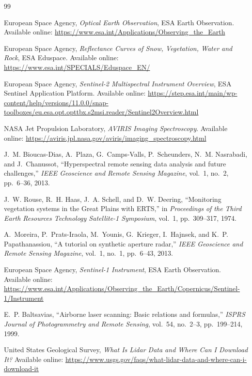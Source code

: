 \documentclass[11pt,a4paper]{article}
\begin{document}
\begin{thebibliography}{99}

European Space Agency,
\textit{Optical Earth Observation},
ESA Earth Observation.
Available online:
\url{https://www.esa.int/Applications/Observing_the_Earth}

European Space Agency,
\textit{Reflectance Curves of Snow, Vegetation, Water and Rock},
ESA Eduspace.
Available online:
\url{https://www.esa.int/SPECIALS/Eduspace_EN/}

European Space Agency,
\textit{Sentinel-2 Multispectral Instrument Overview},
ESA Sentinel Application Platform.
Available online:
\url{https://step.esa.int/main/wp-content/help/versions/11.0.0/snap-toolboxes/eu.esa.opt.opttbx.s2msi.reader/Sentinel2Overview.html}

NASA Jet Propulsion Laboratory,
\textit{AVIRIS Imaging Spectroscopy}.
Available online:
\url{https://aviris.jpl.nasa.gov/aviris/imaging_spectroscopy.html}

J.~M. Bioucas-Dias, A.~Plaza, G.~Camps-Valls, P.~Scheunders,
N.~M. Nasrabadi, and J.~Chanussot,
``Hyperspectral remote sensing data analysis and future challenges,''
\textit{IEEE Geoscience and Remote Sensing Magazine},
vol.~1, no.~2, pp.~6--36, 2013.

J.~W. Rouse, R.~H. Haas, J.~A. Schell, and D.~W. Deering,
``Monitoring vegetation systems in the Great Plains with ERTS,''
in \textit{Proceedings of the Third Earth Resources Technology
Satellite-1 Symposium},
vol.~1, pp.~309--317, 1974.

A.~Moreira, P.~Prats-Iraola, M.~Younis, G.~Krieger, I.~Hajnsek,
and K.~P. Papathanassiou,
``A tutorial on synthetic aperture radar,''
\textit{IEEE Geoscience and Remote Sensing Magazine},
vol.~1, no.~1, pp.~6--43, 2013.

European Space Agency,
\textit{Sentinel-1 Instrument},
ESA Earth Observation.
Available online:
\url{https://www.esa.int/Applications/Observing_the_Earth/Copernicus/Sentinel-1/Instrument}

E.~P. Baltsavias,
``Airborne laser scanning: Basic relations and formulas,''
\textit{ISPRS Journal of Photogrammetry and Remote Sensing},
vol.~54, no.~2--3, pp.~199--214, 1999.

United States Geological Survey,
\textit{What Is Lidar Data and Where Can I Download It?}
Available online:
\url{https://www.usgs.gov/faqs/what-lidar-data-and-where-can-i-download-it}


\end{thebibliography}
\end{document}
